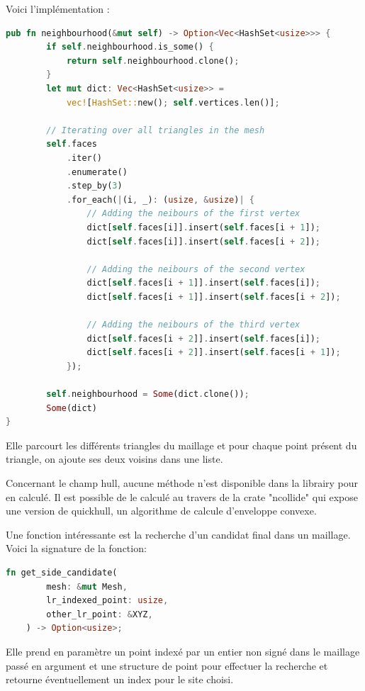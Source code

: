 Voici l'implémentation : 
\begin{lstlisting}[language=Rust, style=boxed]
pub fn neighbourhood(&mut self) -> Option<Vec<HashSet<usize>>> {
        if self.neighbourhood.is_some() {
            return self.neighbourhood.clone();
        }
        let mut dict: Vec<HashSet<usize>> = 
            vec![HashSet::new(); self.vertices.len()];

        // Iterating over all triangles in the mesh
        self.faces
            .iter()
            .enumerate()
            .step_by(3)
            .for_each(|(i, _): (usize, &usize)| {
                // Adding the neibours of the first vertex
                dict[self.faces[i]].insert(self.faces[i + 1]);
                dict[self.faces[i]].insert(self.faces[i + 2]);

                // Adding the neibours of the second vertex
                dict[self.faces[i + 1]].insert(self.faces[i]);
                dict[self.faces[i + 1]].insert(self.faces[i + 2]);

                // Adding the neibours of the third vertex
                dict[self.faces[i + 2]].insert(self.faces[i]);
                dict[self.faces[i + 2]].insert(self.faces[i + 1]);
            });

        self.neighbourhood = Some(dict.clone());
        Some(dict)
}
\end{lstlisting}

Elle parcourt les différents triangles du maillage et pour chaque point présent du triangle, on ajoute ses deux voisins dans une liste.

Concernant le champ hull, aucune méthode n'est disponible dans la librairy pour en calculé. Il est possible de le calculé au travers de la crate "ncollide" qui expose une version de quickhull, un algorithme de calcule d'enveloppe convexe.

Une fonction intéressante est la recherche d'un candidat final dans un maillage. Voici la signature de la fonction:
\begin{lstlisting}[language=Rust, style=boxed]
fn get_side_candidate(
        mesh: &mut Mesh,
        lr_indexed_point: usize,
        other_lr_point: &XYZ,
    ) -> Option<usize>;
\end{lstlisting}

Elle prend en paramètre un point indexé par un entier non signé dans le maillage passé en argument et une structure de point pour effectuer la recherche et retourne éventuellement un index pour le site choisi.


